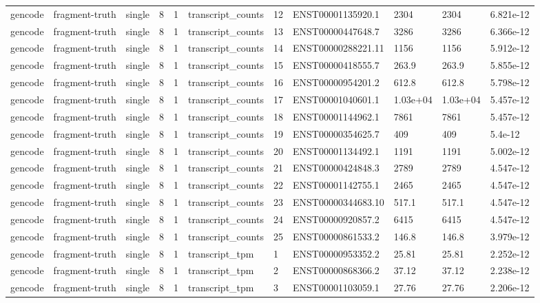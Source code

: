 \begin{tabular}{lllllllllll}
gencode & fragment-truth & single & 8 & 1 & transcript\_counts & 12 & ENST00001135920.1 & 2304 & 2304 & 6.821e-12 \\
gencode & fragment-truth & single & 8 & 1 & transcript\_counts & 13 & ENST00000447648.7 & 3286 & 3286 & 6.366e-12 \\
gencode & fragment-truth & single & 8 & 1 & transcript\_counts & 14 & ENST00000288221.11 & 1156 & 1156 & 5.912e-12 \\
gencode & fragment-truth & single & 8 & 1 & transcript\_counts & 15 & ENST00000418555.7 & 263.9 & 263.9 & 5.855e-12 \\
gencode & fragment-truth & single & 8 & 1 & transcript\_counts & 16 & ENST00000954201.2 & 612.8 & 612.8 & 5.798e-12 \\
gencode & fragment-truth & single & 8 & 1 & transcript\_counts & 17 & ENST00001040601.1 & 1.03e+04 & 1.03e+04 & 5.457e-12 \\
gencode & fragment-truth & single & 8 & 1 & transcript\_counts & 18 & ENST00001144962.1 & 7861 & 7861 & 5.457e-12 \\
gencode & fragment-truth & single & 8 & 1 & transcript\_counts & 19 & ENST00000354625.7 & 409 & 409 & 5.4e-12 \\
gencode & fragment-truth & single & 8 & 1 & transcript\_counts & 20 & ENST00001134492.1 & 1191 & 1191 & 5.002e-12 \\
gencode & fragment-truth & single & 8 & 1 & transcript\_counts & 21 & ENST00000424848.3 & 2789 & 2789 & 4.547e-12 \\
gencode & fragment-truth & single & 8 & 1 & transcript\_counts & 22 & ENST00001142755.1 & 2465 & 2465 & 4.547e-12 \\
gencode & fragment-truth & single & 8 & 1 & transcript\_counts & 23 & ENST00000344683.10 & 517.1 & 517.1 & 4.547e-12 \\
gencode & fragment-truth & single & 8 & 1 & transcript\_counts & 24 & ENST00000920857.2 & 6415 & 6415 & 4.547e-12 \\
gencode & fragment-truth & single & 8 & 1 & transcript\_counts & 25 & ENST00000861533.2 & 146.8 & 146.8 & 3.979e-12 \\
gencode & fragment-truth & single & 8 & 1 & transcript\_tpm & 1 & ENST00000953352.2 & 25.81 & 25.81 & 2.252e-12 \\
gencode & fragment-truth & single & 8 & 1 & transcript\_tpm & 2 & ENST00000868366.2 & 37.12 & 37.12 & 2.238e-12 \\
gencode & fragment-truth & single & 8 & 1 & transcript\_tpm & 3 & ENST00001103059.1 & 27.76 & 27.76 & 2.206e-12 \\

\end{tabular}
